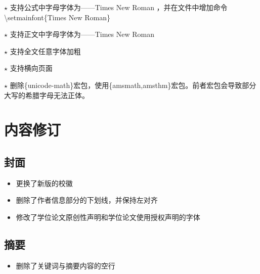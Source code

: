 $\star$ 支持{\color{blue}公式}中字母字体为——Times New Roman ，并在{\color{blue}{main.tex}}文件中增加命令{\color{blue}\textbackslash setmainfont\{Times New Roman\}}
\begin{latex}
    \RequirePackage{mathptmx}
\end{latex}


$\star$ 支持{\color{blue}正文}中字母字体为——Times New Roman 
\begin{latex}
    \RequirePackage{fontspec}
\end{latex}

$\star$ 支持全文任意字体加粗
\begin{latex}
    \RequirePackage{bm}
\end{latex}

$\star$ 支持横向页面
\begin{latex}
    \RequirePackage{pdflscape}
\end{latex}

$\star$ 删除{\color{blue}\{unicode-math\}}宏包，使用{\color{blue}\{amsmath,amsthm\}}宏包。前者宏包会导致部分大写的希腊字母无法正体。
\begin{latex}
    \RequirePackage{amsmath,amsthm}
\end{latex}


\section{内容修订}
\subsection{封面}
\begin{itemize}
    \item 更换了新版的校徽
    \item 删除了作者信息部分的下划线，并保持左对齐
    \item 修改了{\color{blue}学位论文原创性声明}和{\color{blue}学位论文使用授权声明}的字体
\end{itemize}
\subsection{摘要}
\begin{itemize}
    \item 删除了关键词与摘要内容的空行
\end{itemize}
